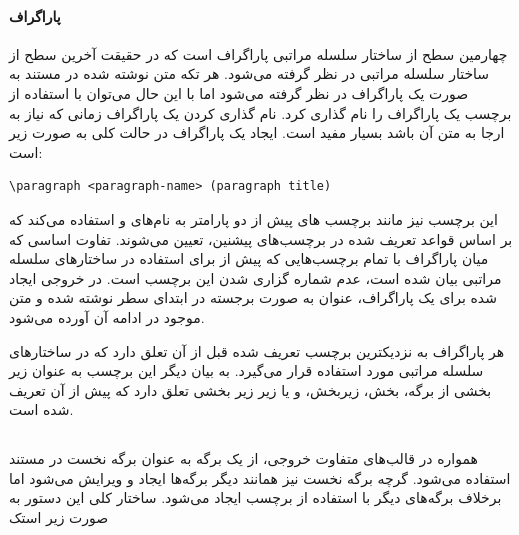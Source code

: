     
\paragraph{پاراگراف}

چهارمین سطح از ساختار سلسله مراتبی پاراگراف است که در
حقیقت آخرین سطح از ساختار سلسله مراتبی در نظر گرفته می‌شود. هر تکه متن نوشته شده
در مستند به صورت یک پاراگراف در نظر گرفته می‌شود اما با این حال می‌توان با
استفاده از برچسب  یک پاراگراف را نام گذاری کرد. نام گذاری کردن یک
پاراگراف زمانی که نیاز به ارجا به متن آن باشد بسیار مفید است. ایجاد یک پاراگراف
در حالت کلی به صورت زیر است:

\begin{latin}
\lstset{language=C++}  
\begin{lstlisting}[frame=single] 
\paragraph <paragraph-name> (paragraph title)
\end{lstlisting}
\end{latin}

این برچسب نیز مانند برچسب های پیش از دو پارامتر به نام‌های  و
 استفاده می‌کند که بر اساس قواعد تعریف شده در برچسب‌های
پیشنین، تعیین می‌شوند. تفاوت اساسی که میان پاراگراف با تمام برچسب‌هایی که پیش از
برای استفاده در ساختارهای سلسله مراتبی بیان شده است، عدم شماره گزاری شدن این
برچسب است. در خروجی ایجاد شده برای یک پاراگراف، عنوان به صورت برجسته در ابتدای
سطر نوشته شده و متن موجود در ادامه آن آورده می‌شود.

\begin{note}
هر پاراگراف به نزدیکترین برچسب تعریف شده قبل از آن تعلق
دارد که در ساختارهای سلسله مراتبی مورد استفاده قرار می‌گیرد. به بیان دیگر این
برچسب به عنوان زیر بخشی از برگه، بخش، زیربخش، و یا زیر زیر بخشی تعلق دارد که پیش
از آن تعریف شده است.
\end{note}
    

\subsection{}

همواره در قالب‌های متفاوت خروجی، از یک برگه به عنوان برگه نخست در مستند استفاده
می‌شود. گرچه برگه نخست نیز همانند دیگر برگه‌ها ایجاد و ویرایش می‌شود اما برخلاف
برگه‌های دیگر با استفاده از برچسب  ایجاد می‌شود. ساختار کلی این
دستور به صورت زیر استک

